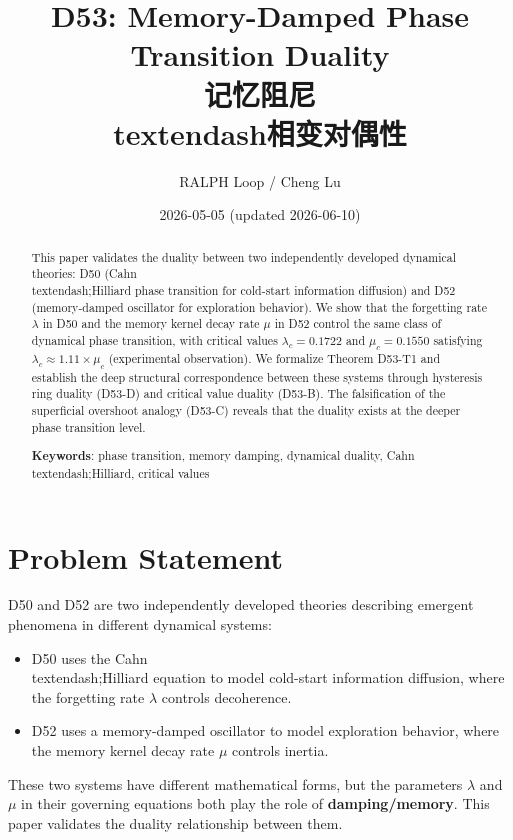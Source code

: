 \documentclass[12pt, a4paper]{article}
\begin{document}
\title{D53: Memory-Damped Phase Transition Duality\\{\small 记忆阻尼\\textendash{}相变对偶性}}
\author{RALPH Loop / Cheng Lu}
\date{2026-05-05 (updated 2026-06-10)}
\maketitle

\begin{abstract}
This paper validates the duality between two independently developed dynamical theories: D50 (Cahn\\textendash;Hilliard phase transition for cold-start information diffusion) and D52 (memory-damped oscillator for exploration behavior). We show that the forgetting rate $\lambda$ in D50 and the memory kernel decay rate $\mu$ in D52 control the same class of dynamical phase transition, with critical values $\lambda_c = 0.1722$ and $\mu_c = 0.1550$ satisfying $\lambda_c \approx 1.11 \times \mu_c$ (experimental observation). We formalize Theorem D53-T1 and establish the deep structural correspondence between these systems through hysteresis ring duality (D53-D) and critical value duality (D53-B). The falsification of the superficial overshoot analogy (D53-C) reveals that the duality exists at the deeper phase transition level.

\textbf{Keywords}: phase transition, memory damping, dynamical duality, Cahn\\textendash;Hilliard, critical values
\end{abstract}

\section{Problem Statement}

D50 and D52 are two independently developed theories describing emergent phenomena in different dynamical systems:
\begin{itemize}
    \item D50 uses the Cahn\\textendash;Hilliard equation to model cold-start information diffusion, where the forgetting rate $\lambda$ controls decoherence.
    \item D52 uses a memory-damped oscillator to model exploration behavior, where the memory kernel decay rate $\mu$ controls inertia.
\end{itemize}

These two systems have different mathematical forms, but the parameters $\lambda$ and $\mu$ in their governing equations both play the role of \textbf{damping/memory}. This paper validates the duality relationship between them.
\end{document}
